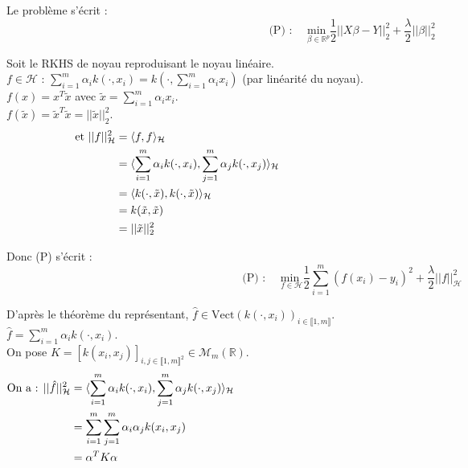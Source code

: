 \documentclass[12pt,a4paper]{article}
\begin{document}
Le problème s'écrit :
\begin{equation}
    \text{(P) : } \quad \underset{\beta \in \mathbb{R}^p}{\text{min }} \frac{1}{2} ||X\beta - Y||^2_2 + \frac{\lambda}{2} ||\beta||^2_2
\end{equation}

Soit le RKHS de noyau reproduisant le noyau linéaire. \\

$f \in \mathcal{H}$ : $\sum_{i=1}^m \alpha_i k(\cdot, x_i) = k(\cdot, \sum_{i=1}^m \alpha_i x_i)$ (par linéarité du noyau). \\
$f(x) = x^T\tilde{x}$ avec $\tilde{x} = \sum_{i=1}^m \alpha_i x_i$. \\

$f(\tilde{x}) = \tilde{x}^T \tilde{x} = ||\tilde{x}||^2_2$. \\

\begin{align*}
    \text{et } ||f||^2_{\mathcal{H}} & = \langle f, f \rangle_{\mathcal{H}} \hspace{14.5cm} \\
    & = \langle \sum_{i=1}^m \alpha_i k(\cdot, x_i), \sum_{j=1}^m \alpha_j k(\cdot, x_j) \rangle_{\mathcal{H}} \\
    & = \langle k(\cdot, \tilde{x}), k(\cdot, \tilde{x}) \rangle_{\mathcal{H}} \\
    & = k(\tilde{x}, \tilde{x}) \\
    & = ||\tilde{x}||^2_2
\end{align*}

Donc (P) s'écrit :
\begin{equation}
    \text{(P) : } \quad \underset{f \in \mathcal{H}}{\text{min }} \frac{1}{2} \sum_{i=1}^m (f(x_i) - y_i)^2 + \frac{\lambda}{2} ||f||^2_{\mathcal{H}}
\end{equation}

D'après le théorème du représentant, $\hat{f} \in \text{Vect}(k(\cdot, x_i))_{i \in \llbracket 1, m \rrbracket}$. \\

$\hat{f} = \sum_{i=1}^m \alpha_i k(\cdot, x_i)$. \\

On pose $K = \left[k(x_i, x_j)\right]_{i, j \in \llbracket 1, m \rrbracket^2} \in \mathcal{M}_m(\mathbb{R})$. \\

\begin{align*}
    \text{On a : } ||\hat{f}||^2_{\mathcal{H}} & = \langle \sum_{i=1}^m \alpha_i k(\cdot, x_i), \sum_{j=1}^m \alpha_j k(\cdot, x_j) \rangle_{\mathcal{H}} \hspace{14.5cm} \\
    & = \sum_{i=1}^m \sum_{j=1}^m \alpha_i \alpha_j k(x_i, x_j) \\
    & = \alpha^T K \alpha
\end{align*}
\end{document}
